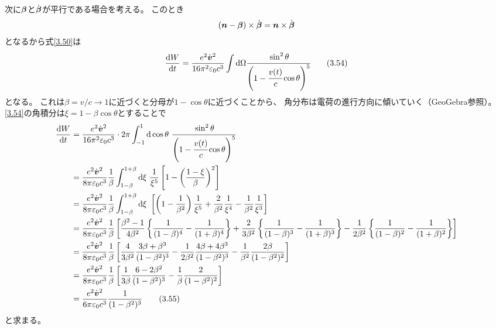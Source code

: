 \documentclass[a4paper, 10pt]{jsarticle}
\theoremstyle{definition}
\def\vec#1{\mbox{\boldmath $#1$}}
\newcommand{\dif}[2]{\frac{{\rm d} #1}{{\rm d} #2}}
\newcommand{\ddif}{{\rm d}}
\begin{document}
次に$\vec{\beta}$と$\dot{\vec{\beta}}$が平行である場合を考える。
このとき
\begin{align}
	\left( \vec{n} - \vec{\beta} \right) \times \dot{\vec{\beta}}
	= \vec{n} \times \dot{\vec{\beta}}
\end{align}
となるから式\eqref{3.50}は
\begin{align}
	\dif{W}{t} = \frac{e^2 \dot{\vec{v}}^2}{16 \pi^2 \varepsilon_0 c^3}
	\int \ddif \Omega
	\cfrac{\sin^2 \theta}{\left( 1 - \cfrac{v(t)}{c} \cos \theta \right)^5}
	\tag{3.54} \label{3.54}
\end{align}
となる。
これは$\beta = v/c \to 1$に近づくと分母が$1 - \cos \theta$に近づくことから、
角分布は電荷の進行方向に傾いていく（GeoGebra参照）。
\eqref{3.54}の角積分は$\xi = 1 - \beta \cos \theta$とすることで
\begin{align}
	\dif{W}{t} &= \frac{e^2 \dot{\vec{v}}^2}{16 \pi^2 \varepsilon_0 c^3}
	\cdot 2\pi \int_{-1}^{1} \ddif \cos \theta \
	\cfrac{\sin^2 \theta}{\left( 1 - \cfrac{v(t)}{c} \cos \theta \right)^5} \\
	&= \frac{e^2 \dot{\vec{v}}^2}{8 \pi \varepsilon_0 c^3} \frac{1}{\beta}
	\int_{1-\beta}^{1+\beta} \ddif \xi \ \frac{1}{\xi^5} \left[
		1 - \left( \frac{1 - \xi}{\beta} \right)^2
	\right] \\
	&= \frac{e^2 \dot{\vec{v}}^2}{8 \pi \varepsilon_0 c^3} \frac{1}{\beta}
	\int_{1-\beta}^{1+\beta} \ddif \xi \ \left[
		\left(1 - \frac{1}{\beta^2} \right) \frac{1}{\xi^5}
		+ \frac{2}{\beta^2}\frac{1}{\xi^4} - \frac{1}{\beta^2}\frac{1}{\xi^3}
	\right] \\
	&= \frac{e^2 \dot{\vec{v}}^2}{8 \pi \varepsilon_0 c^3} \frac{1}{\beta}
	\left[
		\frac{\beta^2 - 1}{4\beta^2}
		\left\{ \frac{1}{(1-\beta)^4} - \frac{1}{(1+\beta)^4} \right\}
		+ \frac{2}{3\beta^2}
		\left\{ \frac{1}{(1-\beta)^3} - \frac{1}{(1+\beta)^3}\right\}
		- \frac{1}{2\beta^2}
		\left\{ \frac{1}{(1-\beta)^2} - \frac{1}{(1+\beta)^2} \right\}
	\right] \\
	&= \frac{e^2 \dot{\vec{v}}^2}{8 \pi \varepsilon_0 c^3} \frac{1}{\beta}
	\left[
		\frac{4}{3\beta^2} \frac{3\beta + \beta^3}{(1 - \beta^2)^3}
		- \frac{1}{2\beta^2} \frac{4\beta + 4\beta^3}{(1 - \beta^2)^3}
		- \frac{1}{\beta^2} \frac{2\beta}{(1 - \beta^2)^2}
	\right] \\
	&= \frac{e^2 \dot{\vec{v}}^2}{8 \pi \varepsilon_0 c^3} \frac{1}{\beta}
	\left[
		\frac{1}{3\beta} \frac{6 - 2\beta^2}{(1 - \beta^2)^3}
		- \frac{1}{\beta} \frac{2}{(1 - \beta^2)^2}
	\right] \\
	&= \frac{e^2 \dot{\vec{v}}^2}{6 \pi \varepsilon_0 c^3}
	\frac{1}{(1 - \beta^2)^3}
	\tag{3.55} \label{3.55}
\end{align}
と求まる。
\end{document}
